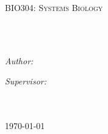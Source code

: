 \documentclass[
12pt, %
oneside, %
english, %
doublespacing, %
toctotoc, %
parskip, %
headsepline, %
chapterinoneline, %
consistentlayout, %
]{MastersDoctoralThesis} %
\author{Siyuan \textsc{Guo} 11611118 } %
\begin{document}
\frontmatter %

\pagestyle{plain} %




\begin{titlepage}
\begin{center}

\vspace*{.06\textheight}
{\scshape\LARGE \univname\par}\vspace{1.5cm} %
\textsc{\Large BIO304: Systems Biology}\\[0.5cm] %

\HRule \\[0.4cm] %
{\huge \bfseries \ttitle\par}\vspace{0.4cm} %
\HRule \\[1.5cm] %
 
\begin{minipage}[t]{0.4\textwidth}
\begin{flushleft} \large
\emph{Author:}\\
\href{http://www.johnsmith.com}{\authorname} %
\end{flushleft}
\end{minipage}
\begin{minipage}[t]{0.4\textwidth}
\begin{flushright} \large
\emph{Supervisor:} \\
\href{http://www.jamessmith.com}{\supname} %
\end{flushright}
\end{minipage}\\[5cm]
\vfill
\Large \deptname\\[0cm] %
{\large \today}\\[1cm] %
 
\end{center}
\end{titlepage}


\end{document}
